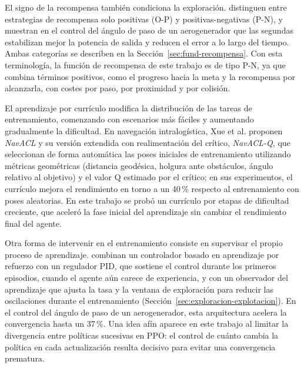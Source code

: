 El signo de la recompensa también condiciona la exploración.
\citet{sierragarcia2020exploring} distinguen entre estrategias de
recompensa solo positivas (O-P) y positivas-negativas (P-N), y muestran
en el control del ángulo de paso de un aerogenerador que las segundas
estabilizan mejor la potencia de salida y reducen el error a lo largo del
tiempo. Ambas categorías se describen en la
Sección~\ref{sec:fund-recompensa}. Con esta terminología, la función de
recompensa de este trabajo es de tipo P-N, ya que combina términos
positivos, como el progreso hacia la meta y la recompensa por alcanzarla,
con costes por paso, por proximidad y por colisión.

El aprendizaje por currículo modifica la distribución de las tareas de
entrenamiento, comenzando con escenarios más fáciles y aumentando
gradualmente la dificultad. En navegación intralogística, Xue et al.
\citep{xue2022using} proponen \textit{NavACL} y su versión extendida con
realimentación del crítico, \textit{NavACL-Q}, que seleccionan de forma
automática las poses iniciales de entrenamiento utilizando métricas
geométricas (distancia geodésica, holgura ante obstáculos, ángulo relativo
al objetivo) y el valor Q estimado por el crítico; en sus experimentos, el
currículo mejora el rendimiento en torno a un 40\,\% respecto al
entrenamiento con poses aleatorias. En este trabajo se probó un
currículo por etapas de dificultad creciente, que aceleró la fase inicial
del aprendizaje sin cambiar el rendimiento final del agente.

Otra forma de intervenir en el entrenamiento consiste en supervisar el
propio proceso de aprendizaje. \citet{sierragarcia2022wind} combinan un
controlador basado en aprendizaje por refuerzo con un regulador PID, que
sostiene el control durante los primeros episodios, cuando el agente aún
carece de experiencia, y con un observador del aprendizaje que ajusta la
tasa y la ventana de exploración para reducir las oscilaciones durante el
entrenamiento (Sección~\ref{sec:exploracion-explotacion}). En el control
del ángulo de paso de un aerogenerador, esta arquitectura acelera la
convergencia hasta un 37\,\%. Una idea afín aparece en
este trabajo al limitar la divergencia entre políticas sucesivas en PPO:
el control de cuánto cambia la política en cada actualización resulta
decisivo para evitar una convergencia prematura.

